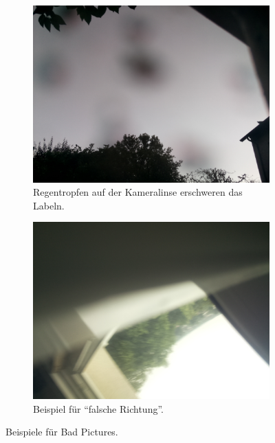 \begin{figure}
  \begin{subfigure}[t]{0.48\textwidth}
    \centering
    \includegraphics[width=\textwidth]{pictures/bad_rain.pdf}
    \caption{Regentropfen auf der Kameralinse erschweren das Labeln.}%
    \label{fig:rain}
  \end{subfigure}
  \begin{subfigure}[t]{0.48\textwidth}
    \centering
    \includegraphics[width=\textwidth]{pictures/bad_2.pdf}
    \caption{Beispiel für \enquote{falsche Richtung}.}%
    \label{fig:wrong_direction}
  \end{subfigure}
  \caption{Beispiele für Bad Pictures.}%
  \label{fig:fehler}
\end{figure}

